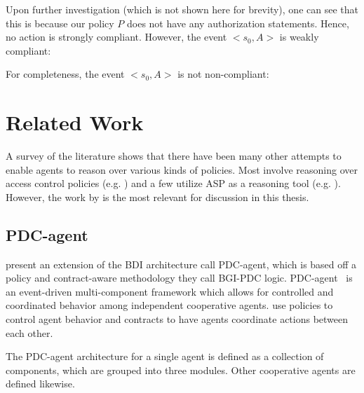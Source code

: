 Upon further investigation (which is not shown here for brevity), one can see that this is because our policy $P$ does not have any authorization statements.
Hence, no action is strongly compliant.
However, the event $<s_0, A>$ is weakly compliant:



For completeness, the event $<s_0, A>$ is not non-compliant:



\section{Related Work}

A survey of the literature shows that there have been many other attempts to enable agents to reason over various kinds of policies.
Most involve reasoning over access control policies (e.g. \citet{ferraiolo_role-based_1995,alves_graph-based_2017,barker_logical_2012,sabri_temporal_2016}) and a few utilize ASP as a reasoning tool (e.g. \citet{barker_reasoning_2014,barker_logical_2012}).
However, the work by \citet{liao_extended_2006} is the most relevant for discussion in this thesis.

\subsection{PDC-agent}

\citet{liao_extended_2006} present an extension of the BDI architecture call PDC-agent, which is based off a policy and contract-aware methodology they call BGI-PDC logic\footnotemark.
PDC-agent~\citep{liao_extended_2006} is an event-driven multi-component framework which allows for controlled and coordinated behavior among independent cooperative agents.
\citet{liao_model_2005} use policies to control agent behavior and contracts to have agents coordinate actions between each other.


\begin{definition}
    The PDC-agent architecture for a single agent is defined as a collection of components, which are grouped into three modules.
    Other cooperative agents are defined likewise.
\end{definition}

